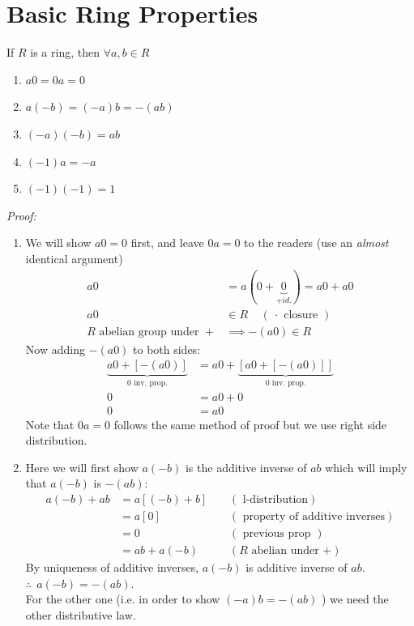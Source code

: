 \section{Basic Ring Properties}
\begin{lemma}
If $R$ is a ring, then $\forall a,b\in R$
\begin{enumerate}[label=(\roman*)]
    \item $a0=0a=0$
    \item $a(-b)=(-a)b=-(ab)$
    \item $(-a)(-b)=ab$
    \item $(-1)a=-a$
    \item $(-1)(-1)=1$
\end{enumerate}
\noindent\textit{Proof:}
\begin{enumerate}[label=(\roman*)] 
\item We will show $a0=0$ first, and leave $0a=0$ to the readers (use an \textit{almost} identical argument)
\begin{align}
        a0&=a(0+\underbrace{0}_{+ id.})=a0+a0 \nonumber \\
        a0&\in R \ \ \ \ \ (\ \cdot \text{ closure }) \nonumber \\
        R \text{ abelian group under }+ &\implies -(a0)\in R \nonumber
    \end{align}
    Now adding $-(a0)$ to both sides:
    \begin{align}
        \underbrace{a0+[-(a0)]}_{0 \text{ inv. prop.}}&=a0+\underbrace{[a0+[-(a0)]]}_{0 \text{ inv. prop.}} \nonumber \\
        0&=a0+0 \nonumber \\
        0&= a0 \nonumber
    \end{align}
    Note that $0a=0$ follows the same method of proof but we use right side distribution.
    \item Here we will first show $a(-b)$ is the additive inverse of $ab$ which will imply that $a(-b)$ is $-(ab)$:
    \begin{align}
        a(-b)+ab&= a[(-b)+b] \ \ \ \ \ &(\text{ l-distribution}) \nonumber \\
        &= a[0] \ \ \ \ \ &(\text{ property of additive inverses}) \nonumber \\
        &= 0 \ \ \ \ \ &(\text{ previous prop }) \nonumber \\
        &= ab+a(-b) \ \ \ \ \ &(R \text{ abelian under +}) \nonumber
    \end{align}
    By uniqueness of additive inverses, $a(-b)$ is additive inverse of $ab$. \\ $\therefore \ \  a(-b)=-(ab)$. \\ For the other one (i.e. in order to show $(-a)b=-(ab)$  ) we need the other distributive law.

\end{enumerate}
\end{lemma}

